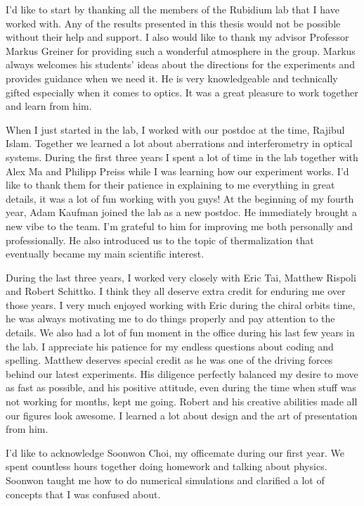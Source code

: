 
I'd like to start by thanking all the members of the Rubidium lab that I have worked with. Any of the results presented in this thesis would not be possible without their help and support. I also would like to thank my advisor Professor Markus Greiner for providing such a wonderful atmosphere in the group. Markus always welcomes his students' ideas about the directions for the experiments and provides guidance when we need it. He is very knowledgeable and technically gifted especially when it comes to optics. It was a great pleasure to work together and learn from him.

When I just started in the lab, I worked with our postdoc at the time, Rajibul Islam. Together we learned a lot about aberrations and interferometry in optical systems. During the first three years I spent a lot of time in the lab together with Alex Ma and Philipp Preiss while I was learning how our experiment works. I'd like to thank them for their patience in explaining to me everything in great details, it was a  lot of fun working with you guys! At the beginning of my fourth year, Adam Kaufman joined the lab as a new postdoc. He immediately brought a new vibe to the team. I'm grateful to him for improving me both personally and professionally. He also introduced us to the topic of thermalization that eventually became my main scientific interest.

During the last three years, I worked very closely with Eric Tai, Matthew Rispoli and Robert Schittko. I think they all deserve extra credit for enduring me over those years. I very much enjoyed working with Eric during the chiral orbits time, he was always motivating me to do things properly and pay attention to the details. We also had a lot of fun moment in the office during his last few years in the lab. I appreciate his patience for my endless questions about coding and spelling. Matthew deserves special credit as he was one of the driving forces behind our latest experiments. His diligence perfectly balanced my desire to move as fast as possible, and his positive attitude, even during the time when stuff was not working for months, kept me going. Robert and his creative abilities made all our figures look awesome. I learned a lot about design and the art of presentation from him.

I'd like to acknowledge Soonwon Choi, my officemate during our first year. We spent countless hours together doing homework and talking about physics. Soonwon taught me how to do numerical simulations and clarified a lot of concepts that I was confused about.


